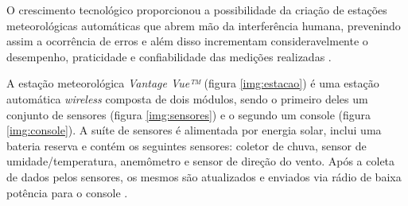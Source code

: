 O crescimento tecnológico proporcionou a possibilidade da criação de estações meteorológicas automáticas que abrem mão da interferência humana, prevenindo assim a ocorrência de erros e além disso incrementam consideravelmente o desempenho, praticidade e confiabilidade das medições realizadas \cite{torres2015aquisicao}.  

A estação meteorológica \textit{Vantage Vue™} (figura \ref{img:estacao}) é uma estação automática \textit{wireless} composta de dois módulos, sendo o primeiro deles um conjunto de sensores (figura \ref{img:sensores}) e o segundo um console (figura \ref{img:console}). A suíte de sensores é alimentada por energia solar, inclui uma bateria reserva e contém os seguintes sensores: coletor de chuva, sensor de umidade/temperatura, anemômetro e sensor de direção do vento. Após a coleta de dados pelos sensores, os mesmos são atualizados e enviados via rádio de baixa potência para o console \cite{SITEDAVIS, VVINSTMANUAL}.

